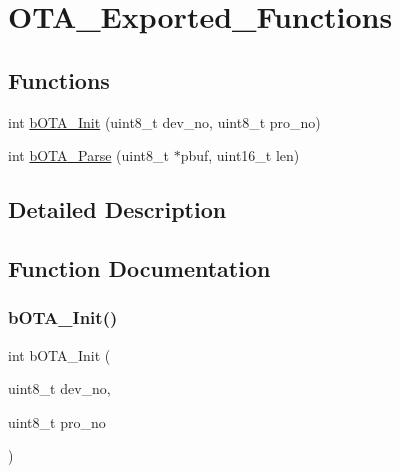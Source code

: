 \hypertarget{group___o_t_a___exported___functions}{}\section{O\+T\+A\+\_\+\+Exported\+\_\+\+Functions}
\label{group___o_t_a___exported___functions}
\subsection*{Functions}
\begin{DoxyCompactItemize}
\item 
int \mbox{\hyperlink{group___o_t_a___exported___functions_ga53bdf541bdf76ac8ee66d2070a6f5ddd}{b\+O\+T\+A\+\_\+\+Init}} (uint8\+\_\+t dev\+\_\+no, uint8\+\_\+t pro\+\_\+no)
\item 
int \mbox{\hyperlink{group___o_t_a___exported___functions_gad41cc6e45b993447b7066ba67882a10b}{b\+O\+T\+A\+\_\+\+Parse}} (uint8\+\_\+t $\ast$pbuf, uint16\+\_\+t len)
\end{DoxyCompactItemize}


\subsection{Detailed Description}


\subsection{Function Documentation}
\mbox{\label{group___o_t_a___exported___functions_ga53bdf541bdf76ac8ee66d2070a6f5ddd}} 
\subsubsection{\texorpdfstring{b\+O\+T\+A\+\_\+\+Init()}{bOTA\_Init()}}
{\footnotesize\ttfamily int b\+O\+T\+A\+\_\+\+Init (\begin{DoxyParamCaption}\item[{uint8\+\_\+t}]{dev\+\_\+no,  }\item[{uint8\+\_\+t}]{pro\+\_\+no }\end{DoxyParamCaption})}

